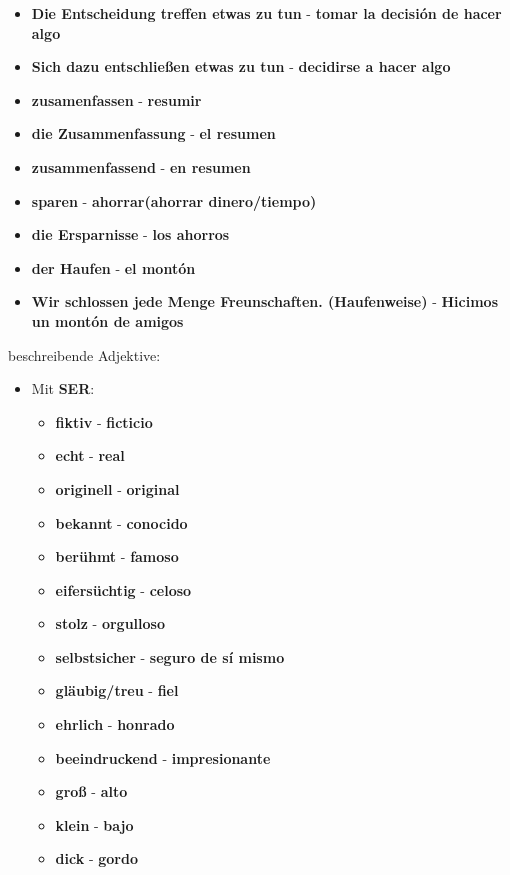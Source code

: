 \documentclass{article}
\begin{document}
\begin{multicols}{2}
\begin{itemize}
		\item{\textbf{Die Entscheidung treffen etwas zu tun} - \textbf{tomar la decisión de hacer algo}}
	\end{itemize}
	\columnbreak
	\begin{itemize}
		\item{\textbf{Sich dazu entschließen etwas zu tun} - \textbf{decidirse a hacer algo}}
		\item{\textbf{zusamenfassen} - \textbf{resumir}}
		\item{\textbf{die Zusammenfassung} - \textbf{el resumen}}
		\item{\textbf{zusammenfassend} - \textbf{en resumen}}
		\item{\textbf{sparen} - \textbf{ahorrar(ahorrar dinero/tiempo)}}
		\item{\textbf{die Ersparnisse} - \textbf{los ahorros}}
		\item{\textbf{der Haufen} - \textbf{el montón}}
		\item{\textbf{Wir schlossen jede Menge Freunschaften. (Haufenweise)} - \textbf{Hicimos un montón de amigos}}
	\end{itemize}
	beschreibende Adjektive:
	\begin{itemize}
		\item{Mit \textbf{SER}:}
		\begin{itemize}
			\item{\textbf{fiktiv} - \textbf{ficticio}}
			\item{\textbf{echt} - \textbf{real}}
			\item{\textbf{originell} - \textbf{original}}
			\item{\textbf{bekannt} - \textbf{conocido}}
			\item{\textbf{berühmt} - \textbf{famoso}}
			\item{\textbf{eifersüchtig} - \textbf{celoso}}
			\item{\textbf{stolz} - \textbf{orgulloso}}
			\item{\textbf{selbstsicher} - \textbf{seguro de sí mismo}}
			\item{\textbf{gläubig/treu} - \textbf{fiel}}
			\item{\textbf{ehrlich} - \textbf{honrado}}
			\item{\textbf{beeindruckend} - \textbf{impresionante}}
			\item{\textbf{groß} - \textbf{alto}}
			\item{\textbf{klein} - \textbf{bajo}}
			\item{\textbf{dick} - \textbf{gordo}}

\end{itemize}
\end{itemize}
\end{multicols}
\end{document}
